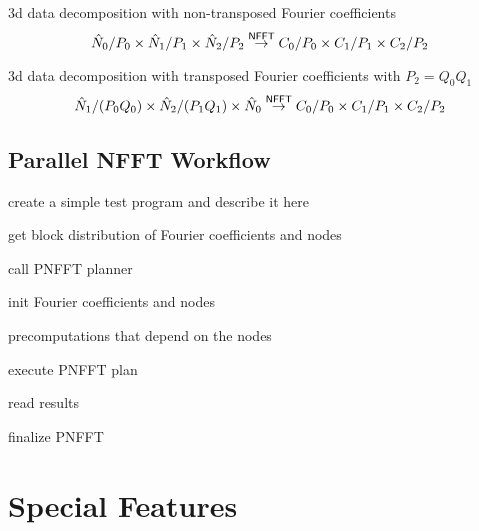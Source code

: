 3d data decomposition with non-transposed Fourier coefficients
\begin{equation*}
  \hat N_0 / P_0 \times \hat N_1 / P_1 \times \hat N_2 / P_2
  \overset{\textsf{\textsf{NFFT}}}{\rightarrow}
  C_0 / P_0 \times C_1 / P_1 \times C_2 / P_2
\end{equation*}

3d data decomposition with transposed Fourier coefficients with $P_2 = Q_0 Q_1$
\begin{equation*}
  \hat N_1 / (P_0 Q_0) \times \hat N_2 / (P_1 Q_1) \times \hat N_0
  \overset{\textsf{\textsf{NFFT}}}{\rightarrow}
  C_0 / P_0 \times C_1 / P_1 \times C_2 / P_2
\end{equation*}


\subsection{Parallel NFFT Workflow}

\begin{compactitem}
  \item create a simple test program and describe it here
\end{compactitem}


\begin{compactitem}
  \item get block distribution of Fourier coefficients and nodes
  \item call PNFFT planner
  \item init Fourier coefficients and nodes
  \item precomputations that depend on the nodes
  \item execute PNFFT plan
  \item read results
  \item finalize PNFFT
\end{compactitem}




\section{Special Features}


